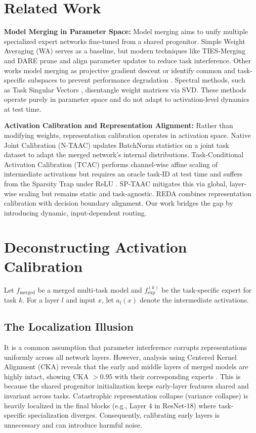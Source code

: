 \documentclass{article}
\theoremstyle{plain}
\theoremstyle{definition}
\theoremstyle{remark}
\begin{document}
\section{Related Work}
\label{sec:related}

\textbf{Model Merging in Parameter Space:} 
Model merging aims to unify multiple specialized expert networks fine-tuned from a shared progenitor. Simple Weight Averaging (WA) serves as a baseline, but modern techniques like TIES-Merging \cite{tiesmerging2023} and DARE \cite{whatmatters2024} prune and align parameter updates to reduce task interference. Other works model merging as projective gradient descent \cite{modelingmultitask2025} or identify common and task-specific subspaces to prevent performance degradation \cite{taskleftbehind2025}. Spectral methods, such as Task Singular Vectors \cite{taskvectors2024}, disentangle weight matrices via SVD. These methods operate purely in parameter space and do not adapt to activation-level dynamics at test time.

\textbf{Activation Calibration and Representation Alignment:} 
Rather than modifying weights, representation calibration operates in activation space. Native Joint Calibration (N-TAAC) \cite{submission7} updates BatchNorm statistics on a joint task dataset to adapt the merged network's internal distributions. Task-Conditional Activation Calibration (TCAC) \cite{submission3} performs channel-wise affine scaling of intermediate activations but requires an oracle task-ID at test time and suffers from the Sparsity Trap under ReLU \cite{submission8}. SP-TAAC \cite{submission8} mitigates this via global, layer-wise scaling but remains static and task-agnostic. REDA \cite{submission7} combines representation calibration with decision boundary alignment. Our work bridges the gap by introducing dynamic, input-dependent routing.

\section{Deconstructing Activation Calibration}
\label{sec:deconstruction}

Let $f_{\text{merged}}$ be a merged multi-task model and $f_{\text{exp}}^{(k)}$ be the task-specific expert for task $k$. For a layer $l$ and input $x$, let $a_l(x)$ denote the intermediate activations.

\subsection{The Localization Illusion}
It is a common assumption that parameter interference corrupts representations uniformly across all network layers. However, analysis using Centered Kernel Alignment (CKA) reveals that the early and middle layers of merged models are highly intact, showing CKA $> 0.95$ with their corresponding experts \cite{submission3}. This is because the shared progenitor initialization keeps early-layer features shared and invariant across tasks. Catastrophic representation collapse (variance collapse) is heavily localized in the final blocks (e.g., Layer 4 in ResNet-18) where task-specific specialization diverges. Consequently, calibrating early layers is unnecessary and can introduce harmful noise.
\end{document}
